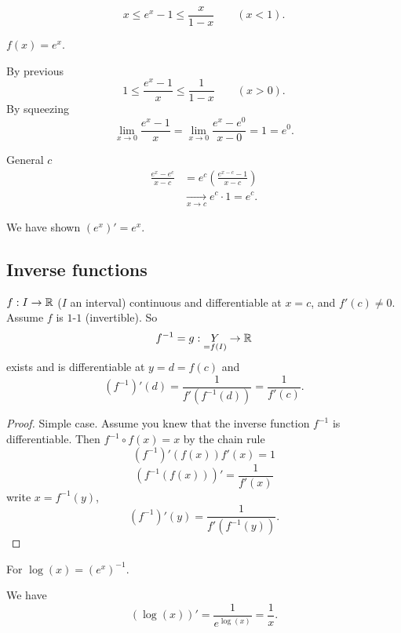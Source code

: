 \documentclass[10pt, a4paper]{article}
\begin{document}
\begin{lemma}
    \[
    x \leq e ^ x - 1 \leq \frac{x}{1 - x}\qquad(x < 1).
    \]
\end{lemma}

\begin{example}
    $f(x) = e ^ x$.
    
    \begin{solution}
        By previous
        \[
        1 \leq \frac{e ^ x - 1}{x} \leq \frac{1}{1 - x}\qquad(x > 0).
        \]
        By squeezing
        \[
        \lim_{x \to 0}\frac{e ^ x - 1}{x} = \lim_{x \to 0}\frac{e ^ x - e ^ 0}{x - 0} = 1 = e ^ 0.
        \]

        General $c$
        \begin{align*}
            \frac{e ^ x - e ^ c}{x - c} &= e ^ c\left(\frac{e ^ {x - c} - 1}{x - c}\right) \\
            &\xrightarrow[x \to c]{}e ^ c \cdot 1 = e ^ c.
        \end{align*}

        We have shown $(e ^ x)' = e ^ x$.
    \end{solution}
\end{example}

\subsection{Inverse functions}
\begin{theorem}
    $f : I \to \mathbb{R}$
    ($I$ an interval)
    continuous and differentiable at $x = c$,
    and $f'(c) \neq 0$.
    Assume $f$ is $1$-$1$
    (invertible).
    So
    \[
    f ^ {-1} = g : \underset{= f(I)}{Y} \to \mathbb{R}
    \]
    exists and is differentiable at $y = d = f(c)$ and
    \[
    (f ^ {-1})'(d) = \frac{1}{f'(f ^ {-1}(d))} = \frac{1}{f'(c)}.
    \]

    \begin{proof}
        Simple case.
        Assume you knew that the inverse function $f ^ {-1}$ is differentiable.
        Then $f ^ {-1} \circ f(x) = x$ by the chain rule
        \[
        (f ^ {-1})'(f(x))f'(x) = 1
        \]
        \[
        (f ^ {-1}(f(x)))' = \frac{1}{f'(x)}
        \]
        write $x = f ^ {-1}(y)$,
        \[
        (f ^ {-1})'(y) = \frac{1}{f'(f ^ {-1}(y))}.
        \]
    \end{proof}
\end{theorem}

\begin{example}
    For $\log(x) = (e ^ x) ^ {-1}$.

    \begin{solution}
        We have
        \[
        (\log(x))' = \frac{1}{e ^ {\log(x)}} = \frac{1}{x}.
        \]
    \end{solution}
\end{example}
\end{document}
